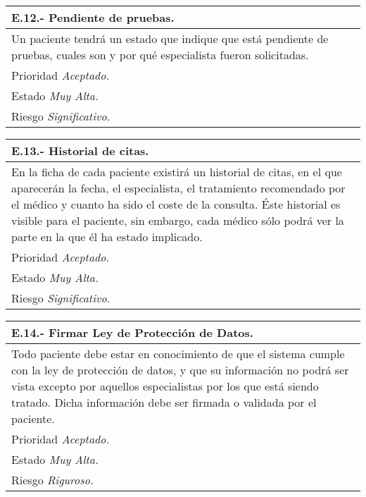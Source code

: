 \documentclass[a4paper,oneside,11pt]{book}
\begin{document}
\begin{center}
\begin{tabulary}{15cm}{|L|}
	\hline
		\bf{E.12.- Pendiente de pruebas.} \\
	\hline
		Un paciente tendrá un estado que indique que está pendiente de pruebas, cuales son y por qué especialista fueron solicitadas. \\
	\hline
		Prioridad \textit{Aceptado.} \\
	\hline
		Estado \textit{Muy Alta.} \\
	\hline
		Riesgo \textit{Significativo.} \\
	\hline
\end{tabulary}
\end{center}

\begin{center}
\begin{tabulary}{15cm}{|L|}
	\hline
		\bf{E.13.- Historial de citas.} \\
	\hline
		En la ficha de cada paciente existirá un historial de citas, en el que aparecerán la fecha, el especialista, el tratamiento recomendado por el médico y cuanto ha sido el coste de la consulta. Éste historial es visible para el paciente, sin embargo, cada médico sólo podrá ver la parte en la que él ha estado implicado. \\
	\hline
		Prioridad \textit{Aceptado.} \\
	\hline
		Estado \textit{Muy Alta.} \\
	\hline
		Riesgo \textit{Significativo.} \\
	\hline
\end{tabulary}
\end{center}

\begin{center}
\begin{tabulary}{15cm}{|L|}
	\hline
		\bf{E.14.- Firmar Ley de Protección de Datos.} \\
	\hline
		Todo paciente debe estar en conocimiento de que el sistema cumple con la ley de protección de datos, y que su información no podrá ser vista excepto por aquellos especialistas por los que está siendo tratado. Dicha información debe ser firmada o validada por el paciente. \\
	\hline
		Prioridad \textit{Aceptado.} \\
	\hline
		Estado \textit{Muy Alta.} \\
	\hline
		Riesgo \textit{Riguroso.} \\
	\hline
\end{tabulary}
\end{center}
\end{document}
